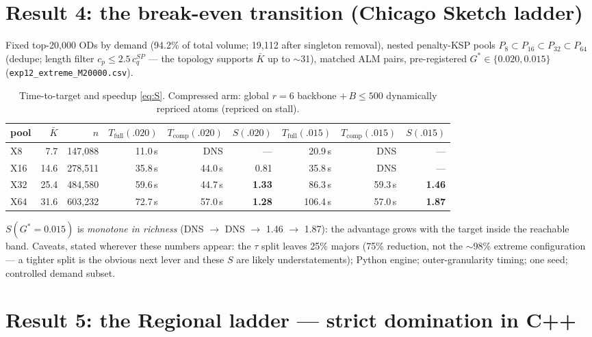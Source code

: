 \documentclass[11pt]{article}
\newcommand{\Kbar}{\bar K}
\begin{document}
\section{Result 4: the break-even transition (Chicago Sketch ladder)}\label{sec:ladder}

Fixed top-20{,}000 ODs by demand (94.2\% of total volume; 19{,}112 after singleton
removal), nested penalty-KSP pools $P_8\subset P_{16}\subset P_{32}\subset P_{64}$
(dedupe; length filter $c_p\le2.5\,c_q^{SP}$ --- the topology supports $\Kbar$ up to
$\sim$31), matched ALM pairs, pre-registered $G^\ast\in\{0.020,0.015\}$
(\texttt{exp12\_extreme\_M20000.csv}).

\begin{table}[h]\centering\small
\caption{Time-to-target and speedup \eqref{eq:S}. Compressed arm: global $r{=}6$
backbone $+\,B\le500$ dynamically repriced atoms (repriced on stall).}
\begin{tabular}{lrrrrrrrr}
\toprule
pool & $\Kbar$ & $n$ & $T_{\mathrm{full}}(.020)$ & $T_{\mathrm{comp}}(.020)$ &
$S(.020)$ & $T_{\mathrm{full}}(.015)$ & $T_{\mathrm{comp}}(.015)$ & $S(.015)$\\
\midrule
X8  & 7.7  & 147{,}088 & 11.0\,s & DNS & --- & 20.9\,s & DNS & ---\\
X16 & 14.6 & 278{,}511 & 35.8\,s & 44.0\,s & 0.81 & 35.8\,s & DNS & ---\\
X32 & 25.4 & 484{,}580 & 59.6\,s & 44.7\,s & \textbf{1.33} & 86.3\,s & 59.3\,s & \textbf{1.46}\\
X64 & 31.6 & 603{,}232 & 72.7\,s & 57.0\,s & \textbf{1.28} & 106.4\,s & 57.0\,s & \textbf{1.87}\\
\bottomrule
\end{tabular}
\end{table}

\noindent $S(G^\ast{=}0.015)$ is \emph{monotone in richness} (DNS $\to$ DNS $\to$ 1.46
$\to$ 1.87): the advantage grows with the target inside the reachable band. Caveats,
stated wherever these numbers appear: the $\tau$ split leaves 25\% majors (75\%
reduction, not the $\sim$98\% extreme configuration --- a tighter split is the obvious
next lever and these $S$ are likely understatements); Python engine; outer-granularity
timing; one seed; controlled demand subset.

\section{Result 5: the Regional ladder --- strict domination in C++}\label{sec:regionalladder}
\end{document}
